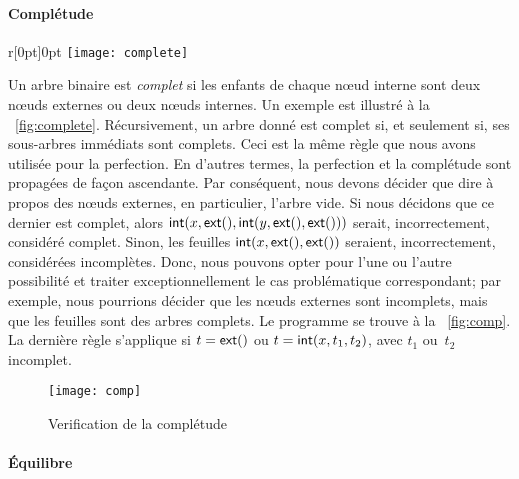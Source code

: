 \paragraph{Complétude}

%
\begin{wrapfigure}[7]{r}[0pt]{0pt}
\centering
\texttt{[image: complete]}
\caption{}
\label{fig:complete}
\end{wrapfigure}
Un arbre binaire est \emph{complet} si les enfants de chaque nœud interne sont deux nœuds
externes ou deux nœuds internes. Un exemple est illustré à la
\fig~\ref{fig:complete}. Récursivement, un arbre donné est complet si,
et seulement si, ses sous-arbres immédiats sont complets. Ceci est la
même règle que nous avons utilisée pour la perfection. En d'autres
termes, la perfection et la complétude sont propagées de façon
ascendante. Par conséquent, nous devons décider que dire à propos des
nœuds externes, en particulier, l'arbre vide. Si nous décidons que ce
dernier est complet, alors
\(\textsf{int}(x,\textsf{ext}(),\textsf{int}(y,\textsf{ext}(),\textsf{ext}()))\)
serait, incorrectement, considéré complet. Sinon, les
feuilles
\(\textsf{int}(x,\textsf{ext}(),\textsf{ext}())\) seraient, incorrectement,
considérées incomplètes. Donc, nous pouvons opter pour l'une ou
l'autre possibilité et traiter exceptionnellement le cas problématique
correspondant; par exemple, nous pourrions décider que les nœuds
externes sont incomplets, mais que les feuilles sont des arbres
complets. Le programme se trouve à la \fig~\vref{fig:comp}. La
dernière règle s'applique si \(t=\textsf{ext}()\) ou
\(t=\textsf{int}(x,t_1,t_2)\), avec \(t_1\) ou~\(t_2\) incomplet.

\bigskip

\begin{figure}[h]
\centering
\texttt{[image: comp]}
\caption{Verification de la complétude}
\label{fig:comp}
\end{figure}

\paragraph{Équilibre}

